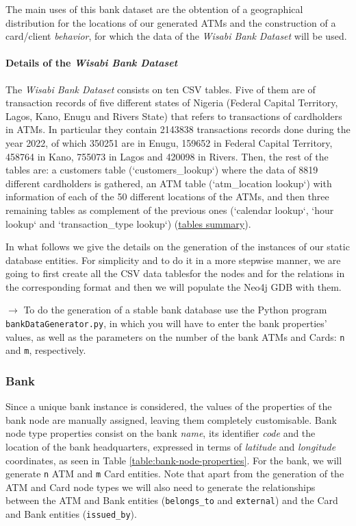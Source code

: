 \documentclass{article}
\begin{document}
The main uses of this bank dataset are the obtention of a geographical distribution for
the locations of our generated ATMs and the construction of a card/client \emph{behavior},
for which the data of the \emph{Wisabi Bank Dataset} will be used.

\paragraph{Details of the \emph{Wisabi Bank Dataset}}
The \emph{Wisabi Bank Dataset} consists on ten CSV tables. Five of them are of transaction records of five different states of Nigeria (Federal Capital Territory, Lagos, Kano, Enugu and Rivers State) that refers to transactions of cardholders in ATMs. In particular they contain 2143838 transactions records done during the year 2022, of which 350251 are in Enugu, 159652 in Federal Capital Territory, 458764 in Kano, 755073 in Lagos and 420098 in Rivers. Then, the rest of the tables are: a customers table (`customers\_lookup`) where the data
of 8819 different cardholders is gathered, an ATM table (`atm\_location lookup`) with
information of each of the 50 different locations of the ATMs, and then three remaining
tables as complement of the previous ones (`calendar lookup`, `hour lookup` and 
`transaction\_type lookup`) 
(\href{https://app.diagrams.net/#G1eAn47YR7-zPNE5KgStkA6_IJcxZRYgX8#%7B%22pageId%22%3A%22R2lEEEUBdFMjLlhIrx00%22%7D}{tables summary}).

In what follows we give the details on the generation of the instances of our static database
entities.
For simplicity and to do it in a more stepwise manner, we are going to first create all the CSV data tablesfor the nodes and for the relations in the corresponding format and then we will populate the Neo4j GDB with them.

$\rightarrow$ To do the generation of a stable bank database use the Python program \texttt{bankDataGenerator.py}, in which you will have to enter the bank properties' values, 
as well as the parameters on the number of the bank ATMs and Cards: \texttt{n} and \texttt{m}, respectively.

\subsubsection*{Bank}

Since a unique bank instance is considered, the values of the properties of the bank node are 
manually assigned, leaving them completely customisable. Bank node type properties consist
on the bank \emph{name}, its identifier \emph{code} and the location
of the bank headquarters, expressed in terms of \emph{latitude} and \emph{longitude}
coordinates, as seen in Table \ref{table:bank-node-properties}.
For the bank, we will generate \texttt{n} ATM and \texttt{m} Card entities. Note that 
apart from the generation of the ATM and Card node types we will also need to generate 
the relationships between the ATM and Bank entities (\texttt{belongs\_to} and \texttt{external}) 
and the Card and Bank entities (\texttt{issued\_by}).
\end{document}

